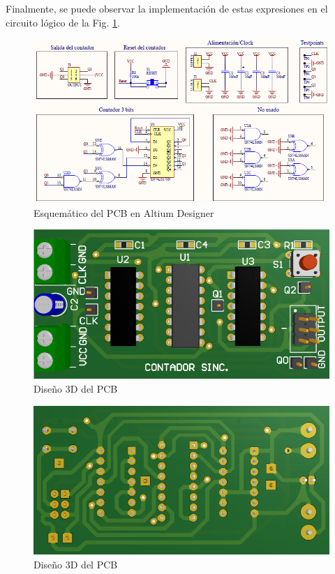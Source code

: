 Finalmente, se puede observar la implementaci\'on de estas expresiones en el circuito l\'ogico de la Fig. \ref{fig:esquematico_sincronico}.

\begin{figure}[H]
    \centering
        \includegraphics[scale=0.7]{../EJ7/Recursos/esquematico_sincronico.PNG}
    \caption{Esquem\'atico del PCB en Altium Designer}
    \label{fig:esquematico_sincronico}
\end{figure}

\begin{figure}[H]
    \centering
    \includegraphics[scale=0.45]{../EJ7/Recursos/3d_top_sincronico.PNG}
    \caption{Dise\~no 3D del PCB}
    \label{fig:3d_sincronico_top}
\end{figure}

\begin{figure}[H]
    \centering
    \includegraphics[scale=0.45]{../EJ7/Recursos/3d_bottom_sincronico.PNG} 
    \caption{Dise\~no 3D del PCB}
    \label{fig:3d_sincronico_bottom}
\end{figure}

